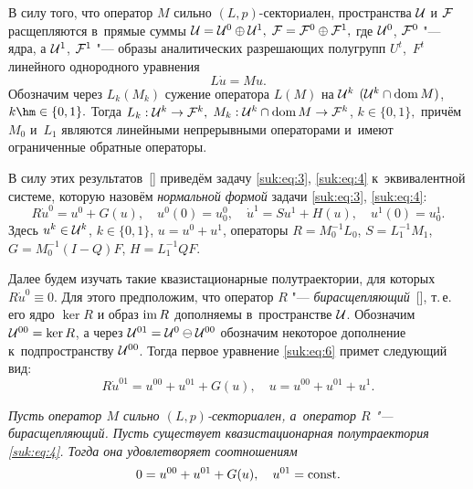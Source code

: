 В силу того, что оператор $M$ сильно $(L,p)$-секториален, пространства ${\cal U}$ и ${\cal F}$ расщепляются в~прямые суммы ${\cal U}={\cal U}^0 \oplus {\cal U}^1 ,$ ${\cal F}={\cal F}^0 \oplus {\cal F}^1 ,$ где
${\cal U}^0$, ${\cal F}^0 $  "---  ядра, а ${\cal U}^1$, ${\cal F}^1 $  "---  образы аналитических разрешающих полугрупп $U^t$,~$F^t$
линейного однородного уравнения
\begin{equation}
L \dot u = Mu.
\label{suk:eq:5}
\end{equation}
Обозначим через $L_k (M_k)$ сужение оператора $L(M)$ на ${\cal U}^k$ $({\cal U}^k \cap {\rm dom\,} M)$, $k\hm \in \{0, 1\}.$ 
Тогда $L_k: {\cal U}^k \to {\cal F}^k ,$ $M_k: {\cal U}^k  \cap {\rm dom\,} M\to {\cal F}^k$, $k\in \{0, 1\},$  причём
$M_0$ и~$L_1$  являются линейными непрерывными операторами и~имеют ограниченные обратные операторы.

В силу этих результатов~[] приведём задачу \eqref{suk:eq:3}, \eqref{suk:eq:4} к~эквивалентной системе, которую назовём {\it нормальной формой} задачи \eqref{suk:eq:3}, \eqref{suk:eq:4}:
\begin{equation}
 R \dot u^0 =u^0+G(u),\quad u^0(0)=u_0^0, \quad \dot u^1=Su^1+H(u),\quad u^1(0)=u_0^1.
\label{suk:eq:6}
\end{equation}
Здесь $u^k \in {\cal U}^k$, $k\in \{0, 1\}$, $u=u^0+u^1$, операторы $R=M_0^{-1}L_0$, $S=L_1^{-1}M_1$, $ G=M_0^{-1}(I-Q)F$, $H=L_1^{-1}QF.$

Далее будем изучать такие  квазистационарные полутраектории,  для  которых $R \dot u^0 \equiv 0 .$
Для этого предположим, что  оператор  $R$   "---  {\it бирасщепляющий}~[], т.\,е. его ядро $\ker R$ и образ ${\rm im}\, R$ дополняемы в~пространстве ${\cal U}$. 
Обозначим ${\cal U}^{00}=\ker R$,  а   через   ${\cal U}^{01}={\cal U}^{0} \ominus {\cal U}^{00}$   обозначим   некоторое   дополнение   к~подпространству ${\cal U}^{00}$. 
Тогда первое уравнение \eqref{suk:eq:6} примет следующий	 вид:
$$R \dot u^{01} =u^{00}+u^{01}+G(u), \quad u=u^{00}+u^{01}+u^1 .$$


\begin{theorem}[1]{\it Пусть  оператор  $M$  сильно  $(L,p)$-секториален, а~оператор    $R$  "---   бирасщепляющий.    
Пусть    существует квазистационарная полутраектория   \eqref{suk:eq:4}. 
Тогда она удовлетворяет соотношениям
\begin{equation}
0 =u^{00}+u^{01}+G(u),\quad u^{01}={\rm const} .
\label{suk:eq:7}
\end{equation}
}
\end{theorem}


